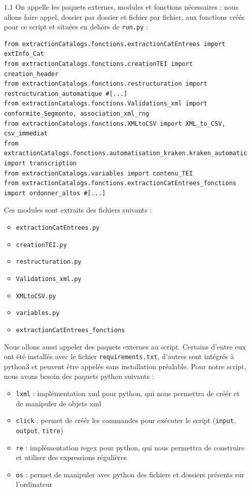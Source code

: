 \documentclass[a4paper,12pt,twoside]{book}
\begin{document}
\begin{itemize}

\item [1.1] On appelle les paquets externes, modules et fonctions nécessaires : nous allons faire appel, dossier par dossier et fichier par fichier, aux fonctions créés pour ce script et situées en dehors de \texttt{run.py} :
\begin{scriptsize}
	\begin{verbatim}
from extractionCatalogs.fonctions.extractionCatEntrees import extInfo_Cat
from extractionCatalogs.fonctions.creationTEI import creation_header
from extractionCatalogs.fonctions.restructuration import restructuration_automatique #[...]
from extractionCatalogs.fonctions.Validations_xml import conformite_Segmonto, association_xml_rng
from extractionCatalogs.fonctions.XMLtoCSV import XML_to_CSV, csv_immediat
from extractionCatalogs.fonctions.automatisation_kraken.kraken_automatic import transcription
from extractionCatalogs.variables import contenu_TEI
from extractionCatalogs.fonctions.extractionCatEntrees_fonctions import ordonner_altos #[...]
	\end{verbatim}
\end{scriptsize}
Ces modules sont extraits des fichiers suivants :
\begin{itemize}
	\item \texttt{extractionCatEntrees.py}
	\item \texttt{creationTEI.py}
	\item \texttt{restructuration.py}
	\item \texttt{Validations\_xml.py}
	\item \texttt{XMLtoCSV.py}
	\item \texttt{variables.py}
	\item \texttt{extractionCatEntrees\_fonctions}
\end{itemize}

Nous allons aussi appeler des paquets externes au script. Certains d'entre eux ont été installés avec le fichier \texttt{requirements.txt}, d'autres sont intégrés à python3 et peuvent être appelés sans installation préalable. Pour notre script, nous avons besoin des paquets python suivants :
\begin{itemize}
	\item \texttt{lxml} : implémentation xml pour python, qui nous permettra de créér et de manipuler de objets xml
	\item \texttt{click} : permet de créér les commandes pour exécuter le script (\texttt{input}, \texttt{output}, \texttt{titre})
	\item \texttt{re} : implémentation regex pour python, qui nous permettra de construire et utiliser des expressions régulières
	\item \texttt{os} : permet de manipuler avec python des fichiers et dossiers présents sur l'ordinateur
\end{itemize}


\end{itemize}
\end{document}
